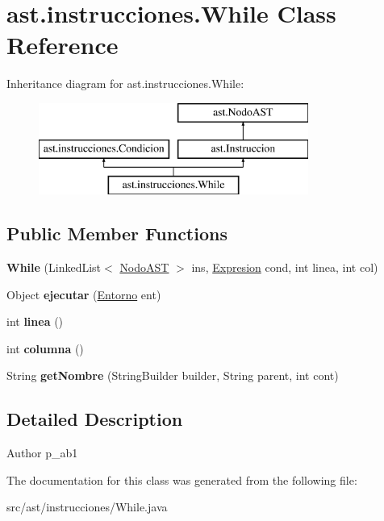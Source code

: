 \hypertarget{classast_1_1instrucciones_1_1_while}{}\section{ast.\+instrucciones.\+While Class Reference}
\label{classast_1_1instrucciones_1_1_while}
Inheritance diagram for ast.\+instrucciones.\+While\+:\begin{figure}[H]
\begin{center}
\leavevmode
\includegraphics[height=3.000000cm]{classast_1_1instrucciones_1_1_while}
\end{center}
\end{figure}
\subsection*{Public Member Functions}
\begin{DoxyCompactItemize}
\item 
\mbox{\label{classast_1_1instrucciones_1_1_while_a03f3cb9d5fb7ab2f38f7a750074bd183}} 
{\bfseries While} (Linked\+List$<$ \mbox{\hyperlink{interfaceast_1_1_nodo_a_s_t}{Nodo\+A\+ST}} $>$ ins, \mbox{\hyperlink{interfaceast_1_1_expresion}{Expresion}} cond, int linea, int col)
\item 
\mbox{\label{classast_1_1instrucciones_1_1_while_a26e0e7c8a6013fb5898da8ed6a796cf8}} 
Object {\bfseries ejecutar} (\mbox{\hyperlink{classentorno_1_1_entorno}{Entorno}} ent)
\item 
\mbox{\label{classast_1_1instrucciones_1_1_while_a6e965ceedcfaf83d93996b284a8c98fc}} 
int {\bfseries linea} ()
\item 
\mbox{\label{classast_1_1instrucciones_1_1_while_ada9c390065cfd7a7e975b090b76ac400}} 
int {\bfseries columna} ()
\item 
\mbox{\label{classast_1_1instrucciones_1_1_while_a6b00b28f9737cdbffe6f413d33cdc951}} 
String {\bfseries get\+Nombre} (String\+Builder builder, String parent, int cont)
\end{DoxyCompactItemize}


\subsection{Detailed Description}
\begin{DoxyAuthor}{Author}
p\+\_\+ab1 
\end{DoxyAuthor}


The documentation for this class was generated from the following file\+:\begin{DoxyCompactItemize}
\item 
src/ast/instrucciones/While.\+java\end{DoxyCompactItemize}
